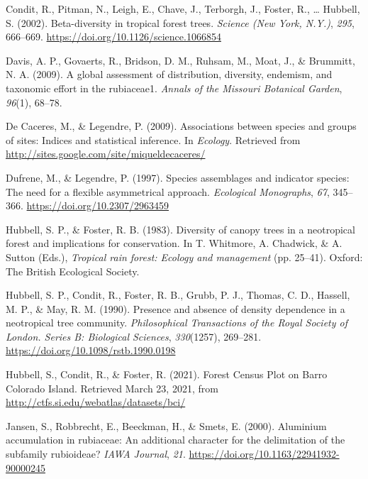 \documentclass[11pt,]{article}
\begin{document}
\hypertarget{ref-article_condit}{}
Condit, R., Pitman, N., Leigh, E., Chave, J., Terborgh, J., Foster, R.,
\ldots{} Hubbell, S. (2002). Beta-diversity in tropical forest trees.
\emph{Science (New York, N.Y.)}, \emph{295}, 666--669.
\url{https://doi.org/10.1126/science.1066854}

\hypertarget{ref-davis2009global}{}
Davis, A. P., Govaerts, R., Bridson, D. M., Ruhsam, M., Moat, J., \&
Brummitt, N. A. (2009). A global assessment of distribution, diversity,
endemism, and taxonomic effort in the rubiaceae1. \emph{Annals of the
Missouri Botanical Garden}, \emph{96}(1), 68--78.

\hypertarget{ref-cita_indicspecies}{}
De Caceres, M., \& Legendre, P. (2009). Associations between species and
groups of sites: Indices and statistical inference. In \emph{Ecology}.
Retrieved from \url{http://sites.google.com/site/miqueldecaceres/}

\hypertarget{ref-dufrene_legendre}{}
Dufrene, M., \& Legendre, P. (1997). Species assemblages and indicator
species: The need for a flexible asymmetrical approach. \emph{Ecological
Monographs}, \emph{67}, 345--366. \url{https://doi.org/10.2307/2963459}

\hypertarget{ref-hubell_foster_1983}{}
Hubbell, S. P., \& Foster, R. B. (1983). Diversity of canopy trees in a
neotropical forest and implications for conservation. In T. Whitmore, A.
Chadwick, \& A. Sutton (Eds.), \emph{Tropical rain forest: Ecology and
management} (pp. 25--41). Oxford: The British Ecological Society.

\hypertarget{ref-hubell_et_all_1990}{}
Hubbell, S. P., Condit, R., Foster, R. B., Grubb, P. J., Thomas, C. D.,
Hassell, M. P., \& May, R. M. (1990). Presence and absence of density
dependence in a neotropical tree community. \emph{Philosophical
Transactions of the Royal Society of London. Series B: Biological
Sciences}, \emph{330}(1257), 269--281.
\url{https://doi.org/10.1098/rstb.1990.0198}

\hypertarget{ref-web_bci}{}
Hubbell, S., Condit, R., \& Foster, R. (2021). Forest Census Plot on
Barro Colorado Island. Retrieved March 23, 2021, from
\url{http://ctfs.si.edu/webatlas/datasets/bci/}

\hypertarget{ref-article}{}
Jansen, S., Robbrecht, E., Beeckman, H., \& Smets, E. (2000). Aluminium
accumulation in rubiaceae: An additional character for the delimitation
of the subfamily rubioideae? \emph{IAWA Journal}, \emph{21}.
\url{https://doi.org/10.1163/22941932-90000245}
\end{document}
